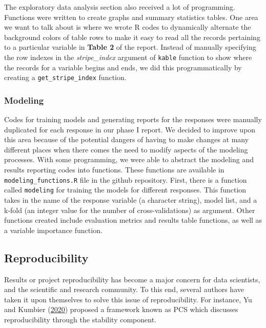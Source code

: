 \documentclass[
  10pt,
]{article}
\begin{document}
The exploratory data analysis section also received a lot of programming. Functions were written to create graphs and summary statistics tables. One area we want to talk about is where we wrote R codes to dynamically alternate the background colors of table rows to make it easy to read all the records pertaining to a particular variable in \textbf{Table 2} of the report. Instead of manually specifying the row indexes in the \emph{stripe\_index} argument of \texttt{kable} function to show where the records for a variable begins and ends, we did this programmatically by creating a \texttt{get\_stripe\_index} function.

\hypertarget{modeling}{%
\subsubsection{Modeling}\label{modeling}}

Codes for training models and generating reports for the responses were manually duplicated for each response in our phase I report. We decided to improve upon this area because of the potential dangers of having to make changes at many different places when there comes the need to modify aspects of the modeling processes. With some programming, we were able to abstract the modeling and results reporting codes into functions. These functions are available in \texttt{modeling\_functions.R} file in the github repository. First, there is a function called \texttt{modeling} for training the models for different responses. This function takes in the name of the response variable (a character string), model list, and a k-fold (an integer value for the number of cross-validations) as argument. Other functions created include evaluation metrics and results table functions, as well as a variable importance function.

\hypertarget{reproducibility}{%
\subsection{Reproducibility}\label{reproducibility}}

Results or project reproducibility has become a major concern for data scientists, and the scientific and research community. To this end, several authors have taken it upon themselves to solve this issue of reproducibility. For instance, Yu and Kumbier (\protect\hyperlink{ref-yu2020veridical}{2020}) proposed a framework known as PCS which discusses reproducibility through the stability component.
\end{document}
